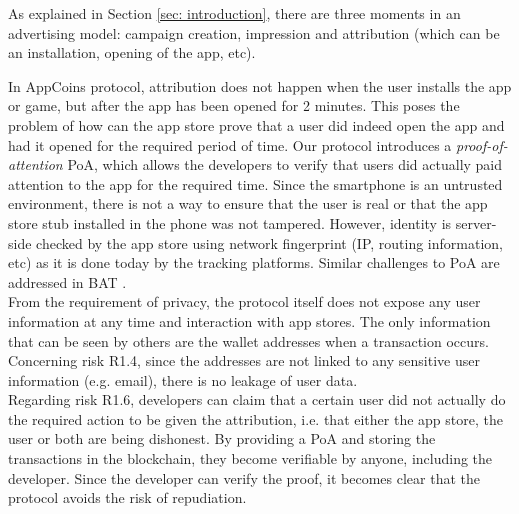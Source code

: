 As explained in Section \ref{sec: introduction}, there are three moments in an advertising model: campaign creation, impression and attribution (which can be an installation, opening of the app, etc). 

In AppCoins protocol, attribution does not happen when the user installs the app or game, but after the app has been opened for 2 minutes. This poses the problem of how can the app store prove that a user did indeed open the app and had it opened for the required period of time. Our protocol introduces a \textit{proof-of-attention} \textsf{PoA}, which allows the developers to verify that users did actually paid attention to the app for the required time. Since the smartphone is an untrusted environment, there is not a way to ensure that the user is real or that the app store stub installed in the phone was not tampered. However, identity is server-side checked by the app store using network fingerprint (IP, routing information, etc) as it is done today by the tracking platforms. Similar challenges to \textsf{PoA} are addressed in BAT \cite{BAT}. \\

From the requirement of privacy, the protocol itself does not expose any user information at any time and interaction with app stores. The only information that can be seen by others are the wallet addresses when a transaction occurs. Concerning risk \textsf{R1.4}, since the addresses are not linked to any sensitive user information (e.g. email), there is no leakage of user data. \\

Regarding risk \textsf{R1.6}, developers can claim that a certain user did not actually do the required action to be given the attribution, i.e. that either the app store, the user or both are being dishonest. By providing a \textsf{PoA} and storing the transactions in the blockchain, they become verifiable by anyone, including the developer. Since the developer can verify the proof, it becomes clear that the protocol avoids the risk of repudiation. \\

